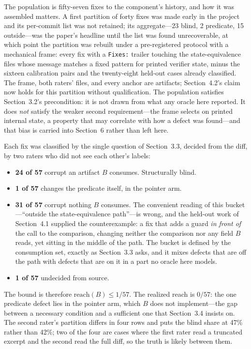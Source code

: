 The population is fifty-seven fixes to the component's history, and how it was
assembled matters. A first partition of forty fixes was made early in the project and
its per-commit list was not retained; its aggregate---23 blind, 2 predicate, 15
outside---was the paper's headline until the list was found unrecoverable, at which
point the partition was rebuilt under a pre-registered protocol with a mechanical
frame: every fix with a \texttt{Fixes:} trailer touching the state-equivalence files
whose message matches a fixed pattern for printed verifier state, minus the sixteen
calibration pairs and the twenty-eight held-out cases already classified. The frame,
both raters' files, and every anchor are artifacts; Section~4.2's claim now holds for
this partition without qualification. The population satisfies Section~3.2's
precondition: it is not drawn from what any oracle here reported. It does
\emph{not} satisfy the weaker second requirement---the frame selects on printed
internal state, a property that may correlate with how a defect was found---and that
bias is carried into Section~6 rather than left here.

Each fix was classified by the single question of Section~3.3, decided from the
diff, by two raters who did not see each other's labels:

\begin{itemize}
\item \textbf{24 of 57} corrupt an artifact $B$ consumes. Structurally blind.
\item \textbf{1 of 57} changes the predicate itself, in the pointer arm.
\item \textbf{31 of 57} corrupt nothing $B$ consumes. The convenient reading of
this bucket---``outside the state-equivalence path''---is wrong, and the held-out
work of Section~4.1 supplied the counterexample: a fix that adds a guard
\emph{in front of} the call to the comparison, changing neither the comparison nor
any field $B$ reads, yet sitting in the middle of the path. The bucket is defined by
the consumption set, exactly as Section~3.3 asks, and it mixes defects that are off
the path with defects that are on it in a part no oracle here models.
\item \textbf{1 of 57} undecided from source.
\end{itemize}

The bound is therefore $\mathrm{reach}(B) \le 1/57$. The realized reach is $0/57$:
the one predicate defect lies in the pointer arm, which $B$ does not implement---the
gap between a necessary condition and a sufficient one that Section~3.4 insists on.
The second rater's partition differs in four rows and puts the blind share at 47\%
rather than 42\%; two of the four are cases where the first rater read a truncated
excerpt and the second read the full diff, so the truth is likely between them.


